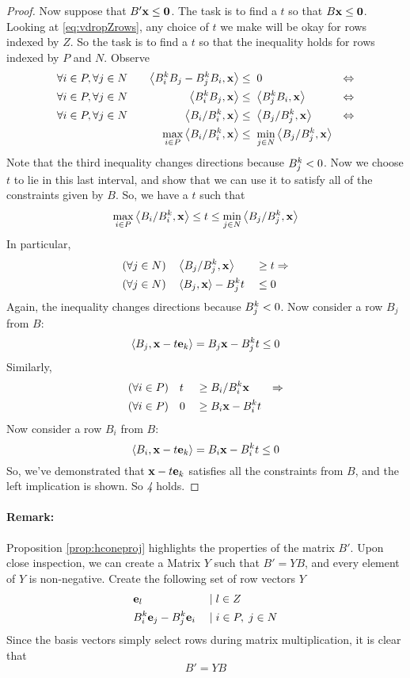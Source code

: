 \begin{proof}
	Now suppose that $B'\mathbf{x} \leq \mathbf{0}$.  The task is to find a $t$ so that $B\mathbf{x} \leq \mathbf{0}$.  Looking at \eqref{eq:vdropZrows}, any choice of $t$ we make will be okay for rows indexed by $Z$.  So the task is to find a $t$ so that the inequality holds for rows indexed by $P$ and $N$.  Observe
	\begin{alignat*}{3}
		\forall i\in P,\forall j \in N & \quad & \left\langle B^k_i B_j - B^k_j B_i, \mathbf{x} \right\rangle    & \leq  \; 0                                & \Leftrightarrow \\
		\forall i\in P,\forall j \in N & \quad & \left\langle B^k_i B_j, \mathbf{x} \right\rangle               & \leq  \; \left\langle B^k_j B_i, \mathbf{x} \right\rangle                & \Leftrightarrow \\
		\forall i\in P,\forall j \in N & \quad & \left\langle B_i/B^k_i, \mathbf{x} \right\rangle               & \leq  \; \left\langle B_j/B^k_j, \mathbf{x} \right\rangle                & \Leftrightarrow \\
		      & \quad & \max_{i\in P} \left\langle B_i/B^k_i, \mathbf{x} \right\rangle & \leq  \; \min_{j\in N}  \left\langle B_j/B^k_j, \mathbf{x} \right\rangle &
	\end{alignat*}
	Note that the third inequality changes directions because $B^k_j < 0$.  Now we choose $t$ to lie in this last interval, and show that we can use it to satisfy all of the constraints given by $ B$.  So, we have a $t$ such that
	\[ \max_{i\in P} \left\langle B_i/B^k_i, \mathbf{x} \right\rangle \leq t \leq \min_{j\in N} \left\langle B_j/B^k_j, \mathbf{x} \right\rangle \]
	In particular,
	\begin{alignat*}{2}
		(\forall j\in N)\quad & \left\langle B_j/B^k_j, \mathbf{x} \right\rangle     \; & \geq & \; t \Rightarrow \\
		(\forall j\in N)\quad & \left\langle B_j, \mathbf{x} \right\rangle - B^k_j t \; & \leq & \; 0
	\end{alignat*}
	Again, the inequality changes directions because $B^k_j < 0$.  Now consider a row $ B_j$ from $ B$:
	\[ \left\langle B_j, \mathbf{x}-t\mathbf{e}_k \right\rangle =  B_j {\mathbf{x}} - B^k_j t \leq 0 \]
	Similarly,
	\begin{alignat*}{3}
		(\forall i\in P)\quad & t \; & \geq & \;  B_i/B^k_i {\mathbf{x}}     & \Rightarrow \\
		(\forall i\in P)\quad & 0 \; & \geq & \;  B_i {\mathbf{x}} - B^k_i t &
	\end{alignat*}
	Now consider a row $ B_i$ from $ B$:
	\[ \left\langle B_i, \mathbf{x}-t\mathbf{e}_k \right\rangle =  B_i {\mathbf{x}} - B^k_i t \leq 0 \]
	So, we've demonstrated that $\mathbf{x}-t\mathbf{e}_k$ satisfies all the constraints from $B$, and the left implication is shown.  So \textit{4} holds.
\end{proof}

\paragraph{Remark:}  \label{rem:fm} Proposition \ref{prop:hconeproj} highlights the properties of the matrix $B'$.  Upon close inspection, we can create a Matrix $Y$ such that $B' = YB$, and every element of $Y$ is non-negative.  Create the following set of row vectors $Y$
\begin{alignat*}{2}
	 & \mathbf{e}_l                  & \;|\; & l \in Z          \\
	 & B^k_i \mathbf{e}_j - B^k_j \mathbf{e}_i & \;|\; & i\in P,\; j\in N
\end{alignat*}
Since the basis vectors simply select rows during matrix multiplication, it is clear that
\[ B' = YB \]

